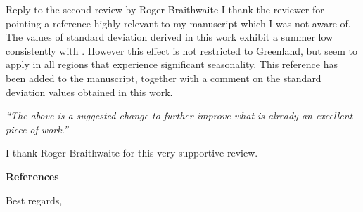 \documentclass{letter}
\newcommand{\rev}[0]{\color{blue!50!black}\it}
\newcommand{\textrev}[1]{{\rev``#1''}}
\begin{document}
\begin{letter}{Reply to the second review by Roger Braithwaite}
I thank the reviewer for pointing a reference highly relevant to my manuscript which I was not aware of. The values of standard deviation derived in this work exhibit a summer low consistently with \citet{fausto-etal-2011}. However this effect is not restricted to Greenland, but seem to apply in all regions that experience significant seasonality. This reference has been added to the manuscript, together with a comment on the standard deviation values obtained in this work.

\textrev{The above is a suggested change to further improve what is already an excellent piece of work.}

I thank Roger Braithwaite for this very supportive review.

\textbf{References}



\closing{Best regards,}

\end{letter}
\end{document}
